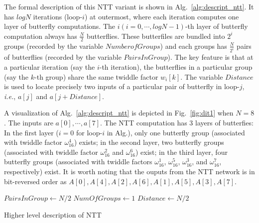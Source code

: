 \documentclass[submission]{iacrtrans}
\theoremstyle{plain}
\begin{document}
The formal description of this NTT variant is shown in Alg.~\ref{alg:descript_ntt}. It has $logN$ iterations (loop-$i$) at outermost, where each iteration computes one layer of butterfly computations.  The $i(i=0,\cdots,logN-1)$-th layer of butterfly computation always has $\frac{N}{2}$ butterflies. These butterfiles are bundled into $2^i$ groups (recorded by the variable $NumberofGroups$) and each groups has $\frac{N}{2^i}$ pairs of butterflies (recorded by the variable $PairsInGroup$). The key feature is that at a particular iteration (say the $i$-th iteration), the butterflies in a particular group (say the $k$-th group) share the same twiddle factor $w_i[k]$. The variable $Distance$ is used to locate precisely two inputs of a particular pair of butterfly in loop-$j$, \textit{i.e.}, $a[j]$ and $a[j+Distance]$.

A visualization of Alg.~\ref{alg:descript_ntt} is depicted in Fig.~\ref{fig:dit1} when $N=8$. The inputs are $a[0],\cdots,a[7]$. The NTT computation has 3 layers of butterfies: In the first layer ($i=0$ for loop-$i$ in Alg.), only one butterfly group (associated with twiddle factor $\omega_{16}^4$) exists; in the second layer, two butterfly groups (associated with twiddle factor $\omega_{16}^2$ and $\omega_{16}^6$) exist; in the third layer, four butterfly groups (associated with twiddle factors $\omega_{16}^1$, $\omega_{16}^5$, $\omega_{16}^3$, and $\omega_{16}^7$, respectively) exist. It is worth noting that the ouputs from the NTT network is in bit-reversed order as $A[0],A[4],A[2],A[6],A[1],A[5],A[3],A[7]$.

\begin{algorithm}[!tbh]
 \DontPrintSemicolon %
    $PairsInGroup \gets N/2$\;
    $NumOfGroups \gets 1$\;
    $Distance \gets N/2$\;
 \caption{Higher level description of NTT}\label{alg:descript_ntt}
\end{algorithm}
\end{document}
